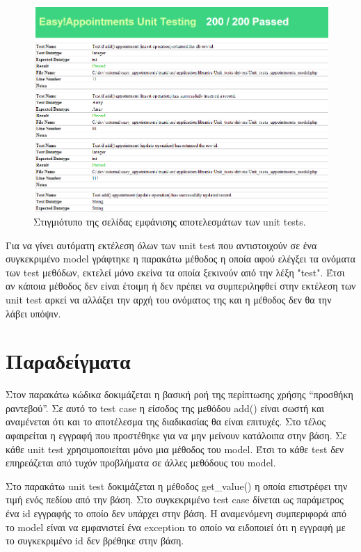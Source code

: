 \begin{figure}[h]
\centering
\includegraphics[width=150mm]{images/ea-unit-testing.png}
\caption{Στιγμιότυπο της σελίδας εμφάνισης αποτελεσμάτων των unit tests.}
\label{ea-unit-testing}
\end{figure}

Για να γίνει αυτόματη εκτέλεση όλων των unit test που αντιστοιχούν σε ένα συγκεκριμένο model γράφτηκε η παρακάτω μέθοδος η οποία αφού ελέγξει τα ονόματα των test μεθόδων, εκτελεί μόνο εκείνα τα οποία ξεκινούν από την λέξη "test". Έτσι αν κάποια μέθοδος δεν είναι έτοιμη ή δεν πρέπει να συμπεριληφθεί στην εκτέλεση των unit test αρκεί να αλλάξει την αρχή του ονόματος της και η μέθοδος δεν θα την λάβει υπόψιν.

 

\section {Παραδείγματα} 
Στον παρακάτω κώδικα δοκιμάζεται η βασική ροή της περίπτωσης χρήσης “προσθήκη ραντεβού”. Σε αυτό το test case η είσοδος της μεθόδου add() είναι σωστή και αναμένεται ότι και το αποτέλεσμα της διαδικασίας θα είναι επιτυχές. Στο τέλος αφαιρείται η εγγραφή που προστέθηκε για να μην μείνουν κατάλοιπα στην βάση. Σε κάθε unit test χρησιμοποιείται μόνο μια μέθοδος του model. Έτσι το κάθε test δεν επηρεάζεται από τυχόν προβλήματα σε άλλες μεθόδους του model.



Στο παρακάτω unit test δοκιμάζεται η μέθοδος get\_value() η οποία επιστρέφει την τιμή ενός πεδίου από την βάση. Στο συγκεκριμένο test case δίνεται ως παράμετρος ένα id εγγραφής το οποίο δεν υπάρχει στην βάση. Η αναμενόμενη συμπεριφορά από το model είναι να εμφανιστεί ένα exception το οποίο να ειδοποιεί ότι η εγγραφή με το συγκεκριμένο id δεν βρέθηκε στην βάση.


